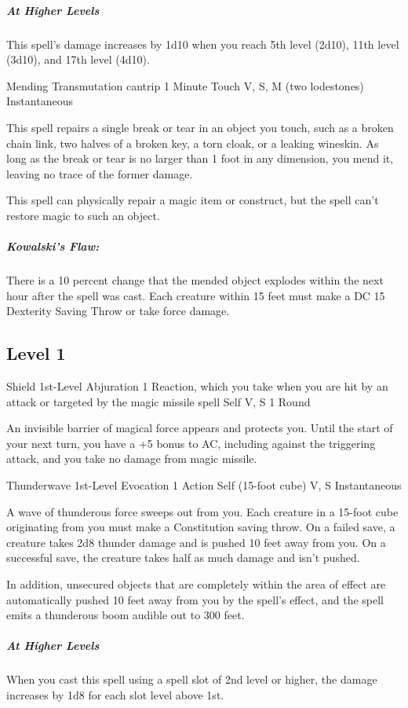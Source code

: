 {\subparagraph*{At Higher Levels} This spell’s damage increases by 1d10 when you reach 5th level (2d10), 11th level (3d10), and 17th level (4d10).

\DndSpellHeader
  {Mending}
  {Transmutation cantrip}
  {1 Minute}
  {Touch}
  {V, S, M (two lodestones)}
  {Instantaneous}

This spell repairs a single break or tear in an object you touch, such as a broken chain link, two halves of a broken key, a torn cloak, or a leaking wineskin. As long as the break or tear is no larger than 1 foot in any dimension, you mend it, leaving no trace of the former damage.

This spell can physically repair a magic item or construct, but the spell can’t restore magic to such an object.

\subparagraph*{Kowalski's Flaw:} There is a 10 percent change that the mended object explodes within the next hour after the spell was cast. Each creature within 15 feet must make a DC 15 Dexterity Saving Throw or take  force damage.

\subsection*{Level 1}

\DndSpellHeader
  {Shield}
  {1st-Level Abjuration}
  {1 Reaction, which you take when you are hit by an attack or targeted by the magic missile spell}
  {Self}
  {V, S}
  {1 Round}

An invisible barrier of magical force appears and protects you. Until the start of your next turn, you have a +5 bonus to AC, including against the triggering attack, and you take no damage from magic missile.

\DndSpellHeader
  {Thunderwave}
  {1st-Level Evocation}
  {1 Action}
  {Self (15-foot cube)}
  {V, S}
  {Instantaneous}

A wave of thunderous force sweeps out from you. Each creature in a 15-foot cube originating from you must make a Constitution saving throw. On a failed save, a creature takes 2d8 thunder damage and is pushed 10 feet away from you. On a successful save, the creature takes half as much damage and isn’t pushed.

In addition, unsecured objects that are completely within the area of effect are automatically pushed 10 feet away from you by the spell’s effect, and the spell emits a thunderous boom audible out to 300 feet.

\subparagraph*{At Higher Levels} When you cast this spell using a spell slot of 2nd level or higher, the damage increases by 1d8 for each slot level above 1st.

}
